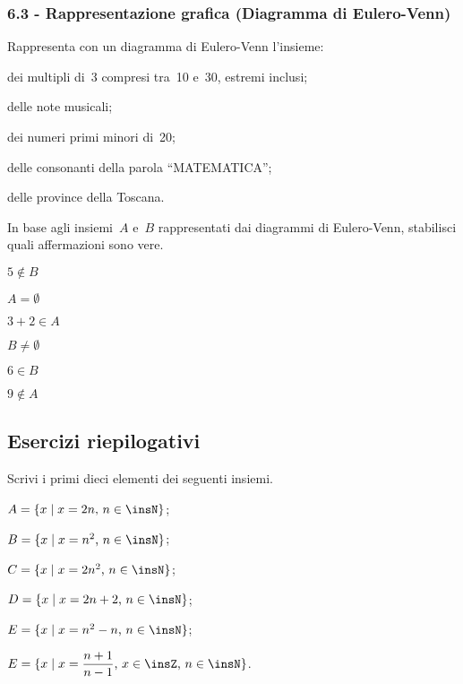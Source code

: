 \subsubsection*{6.3 - Rappresentazione grafica (Diagramma di Eulero-Venn)}

\begin{esercizio}
\label{ese:6.21}
Rappresenta con un diagramma di Eulero-Venn l'insieme:
\begin{enumeratea}
\item dei multipli di~3 compresi tra~10 e~30, estremi inclusi;
\item delle note musicali;
\item dei numeri primi minori di~20;
\item delle consonanti della parola ``MATEMATICA'';
\item delle province della Toscana.
\end{enumeratea}
\end{esercizio}

\begin{esercizio}
\label{ese:6.22}
In base agli insiemi~$A$ e~$B$ rappresentati dai diagrammi di Eulero-Venn, stabilisci quali affermazioni sono vere.
\begin{multicols}{2}
\TabPositions{2.5cm}
\begin{enumeratea}
\item $5\notin B$\tab\boxV\quad\boxF
\item $A=\emptyset $\tab\boxV\quad\boxF
\item $3+2\in A$\tab\boxV\quad\boxF
\item $B\neq \emptyset $\tab\boxV\quad\boxF
\item $6\in B$\tab\boxV\quad\boxF
\item $9\notin A$\tab\boxV\quad\boxF
\end{enumeratea}
\columnbreak

\end{multicols}
\end{esercizio}

\subsection{Esercizi riepilogativi}

\begin{esercizio}
Scrivi i primi dieci elementi dei seguenti insiemi.
\begin{enumeratea}
\spazielenx
\item $A=\{x\mid x=2n\text{, }n\in\insN\}$;
\item $B=\{x\mid x=n^{2}\text{, }n\in\insN\}$;
\item $C=\{x\mid x=2n^{2}\text{, }n\in\insN\}$;
\item $D=\{x\mid x=2n+2\text{, }n\in\insN\}$;
\item $E=\{x\mid x=n^{2}-n\text{, }n\in\insN\}$;
\item $E=\{x\mid x=\dfrac{n+1}{n-1}\text{, }x\in\insZ\text{, }n\in\insN\}$.
\end{enumeratea}
\end{esercizio}

